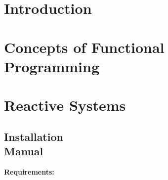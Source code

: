 \documentclass[12pt, a4paper, twoside]{article}
\begin{document}


\newpage



\tableofcontents

\section{Introduction}


\section{Concepts of Functional Programming}


\section{Reactive Systems}


\printbibliography

\newpage

\begin{umaappendices}
\section{Installation \\ Manual}
    
    \textbf{\large{Requirements:}}
    
    \blindtext

\end{umaappendices}
\end{document}
